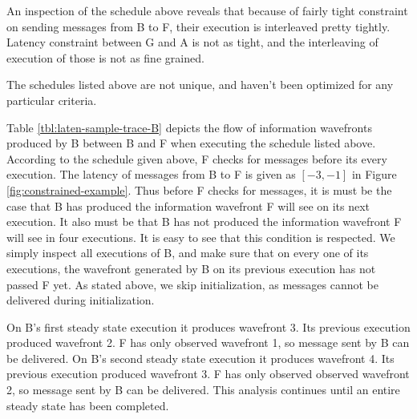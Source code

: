 An inspection of the schedule above reveals that because of fairly
tight constraint on sending messages from {\filter} B to {\filter} F,
their execution is interleaved pretty tightly.  Latency constraint
between {\filter} G and {\filter} A is not as tight, and the
interleaving of execution of those {\filters} is not as fine
grained.

The schedules listed above are not unique, and haven't been
optimized for any particular criteria.

Table \ref{tbl:laten-sample-trace-B} depicts the flow of
information wavefronts produced by {\filter} B between {\filter} B and
{\filter} F when executing the schedule listed above.  According to
the schedule given above, {\filter} F checks for messages before its
every execution.  The latency of messages from B to F is given as
$[-3,-1]$ in Figure \ref{fig:constrained-example}.  Thus before F
checks for messages, it is must be the case that B has produced
the information wavefront F will see on its next execution.  It
also must be that B has not produced the information wavefront F
will see in four executions.  It is easy to see that this
condition is respected.  We simply inspect all executions of B,
and make sure that on every one of its executions, the wavefront
generated by B on its previous execution has not passed F yet.  As
stated above, we skip initialization, as messages cannot be
delivered during initialization.

On B's first steady state execution it produces wavefront 3.  Its
previous execution produced wavefront 2.  F has only observed
wavefront 1, so message sent by B can be delivered. On B's second
steady state execution it produces wavefront 4.  Its previous
execution produced wavefront 3.  F has only observed observed
wavefront 2, so message sent by B can be delivered.  This analysis
continues until an entire steady state has been completed.

